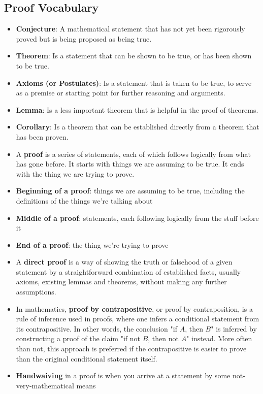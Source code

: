 \documentclass{report}
\begin{document}
      \subsection{Proof Vocabulary}
      \bigbreak \noindent 
      \begin{itemize}
        \item \textbf{Conjecture}: A mathematical statement that has not yet been rigorously proved but is being proposed as being true.
        \item \textbf{Theorem}: Is a statement that can be shown to be true, or has been shown to be true.
        \item \textbf{Axioms (or Postulates)}: Is a statement that is taken to be true, to serve as a premise or starting point for further reasoning and arguments.
        \item \textbf{Lemma}: Is a less important theorem that is helpful in the proof of theorems.
        \item \textbf{Corollary}: Is a theorem that can be established directly from a theorem that has been proven.
        \item A \textbf{proof} is a series of statements, each of which follows logically from what has gone before. It starts with things we are assuming to be true. It ends with the thing we are trying to prove.
        \item \textbf{Beginning of a proof}: things we are assuming to be true, including the definitions of the things we’re talking about
        \item \textbf{Middle of a proof}: statements, each following logically from the stuff before it
        \item \textbf{End of a proof}: the thing we’re trying to prove
        \item A \textbf{direct proof} is a way of showing the truth or falsehood of a given statement by a straightforward combination of established facts, usually axioms, existing lemmas and theorems, without making any further assumptions.
        \item  In mathematics, \textbf{proof by contrapositive}, or proof by contraposition, is a rule of inference used in proofs, where one infers a conditional statement from its contrapositive. In other words, the conclusion "if $A$, then $B$" is inferred by constructing a proof of the claim "if not $B$, then not $A$" instead. More often than not, this approach is preferred if the contrapositive is easier to prove than the original conditional statement itself.
        \item \textbf{Handwaiving} in a proof is when you arrive at a statement by some not-very-mathematical means

\end{itemize}
\end{document}
